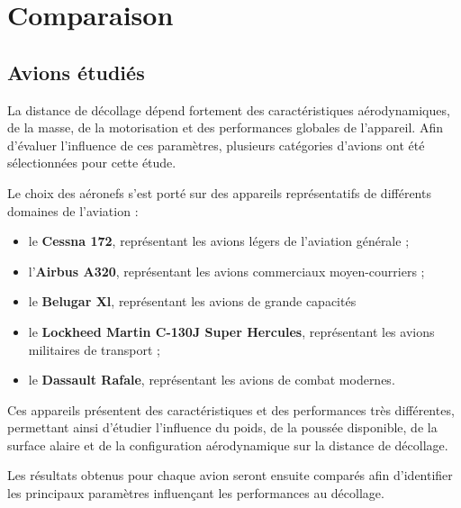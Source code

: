 

\chapter{ Comparaison    }\label{ch:structure}

\section{Avions étudiés}

	La distance de décollage dépend fortement des caractéristiques aérodynamiques, de la masse, de la motorisation et des performances globales de l'appareil. Afin d'évaluer l'influence de ces paramètres, plusieurs catégories d'avions ont été sélectionnées pour cette étude.
	
	Le choix des aéronefs s'est porté sur des appareils représentatifs de différents domaines de l'aviation :
	
	\begin{itemize}
		\item le \textbf{Cessna 172}, représentant les avions légers de l'aviation générale ;
		\item l'\textbf{Airbus A320}, représentant les avions commerciaux moyen-courriers ;
		\item le \textbf{Belugar Xl}, représentant les avions de grande capacités
		\item le \textbf{Lockheed Martin C-130J Super Hercules}, représentant les avions militaires de transport ;
		\item le \textbf{Dassault Rafale}, représentant les avions de combat modernes.
	\end{itemize}
	
	Ces appareils présentent des caractéristiques et des performances très différentes, permettant ainsi d'étudier l'influence du poids, de la poussée disponible, de la surface alaire et de la configuration aérodynamique sur la distance de décollage.
	
	Les résultats obtenus pour chaque avion seront ensuite comparés afin d'identifier les principaux paramètres influençant les performances au décollage.
	
